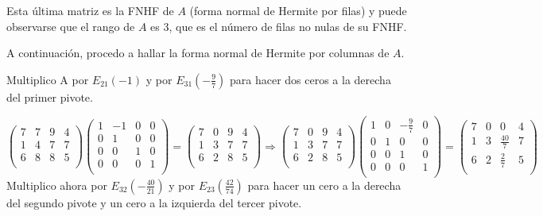 \documentclass[11pt, a4paper]{article}
\newif\IfInSansMode
\theoremstyle{theorem-style}
\theoremstyle{definition-style}
\theoremstyle{remark-style}
\theoremstyle{example-style}
\begin{document}
Esta última matriz es la FNHF de $A$ (forma normal de Hermite por filas) y puede observarse que el rango de $A$ es 3, que es el número de filas no nulas de su FNHF. 

A continuación, procedo a hallar la forma normal de Hermite por columnas de $A$.

Multiplico A por $E_{21}(-1)$ y por $E_{31}(-\frac{9}{7})$ para hacer dos ceros a la derecha del primer pivote.

$
\begin{pmatrix}
7 & 7 & 9 & 4 \\
1 & 4 & 7 & 7 \\
6 & 8 & 8 & 5 \\
\end{pmatrix}
\begin{pmatrix}
1 & -1 & 0 & 0 \\
0 & 1 & 0 & 0 \\
0 & 0 & 1 & 0 \\
0 & 0 & 0 & 1 \\
\end{pmatrix}
 = 
\begin{pmatrix}
7 & 0 & 9 & 4 \\
1 & 3 & 7 & 7 \\
6 & 2 & 8 & 5 \\
\end{pmatrix} \Longrightarrow
\begin{pmatrix}
7 & 0 & 9 & 4 \\
1 & 3 & 7 & 7 \\
6 & 2 & 8 & 5 \\
\end{pmatrix}
\begin{pmatrix}
1 & 0 & -\frac{9}{7} & 0 \\
0 & 1 & 0 & 0 \\
0 & 0 & 1 & 0 \\
0 & 0 & 0 & 1 \\
\end{pmatrix}
 = 
\begin{pmatrix}
7 & 0 & 0 & 4 \\
1 & 3 & \frac{40}{7} & 7 \\
6 & 2 & \frac{2}{7} & 5 \\
\end{pmatrix}$ \\

Multiplico ahora por $E_{32}(-\frac{40}{21})$ y por $E_{23}(\frac{42}{74})$ para hacer un cero a la derecha del segundo pivote y un cero a la izquierda del tercer pivote. \\
\end{document}
